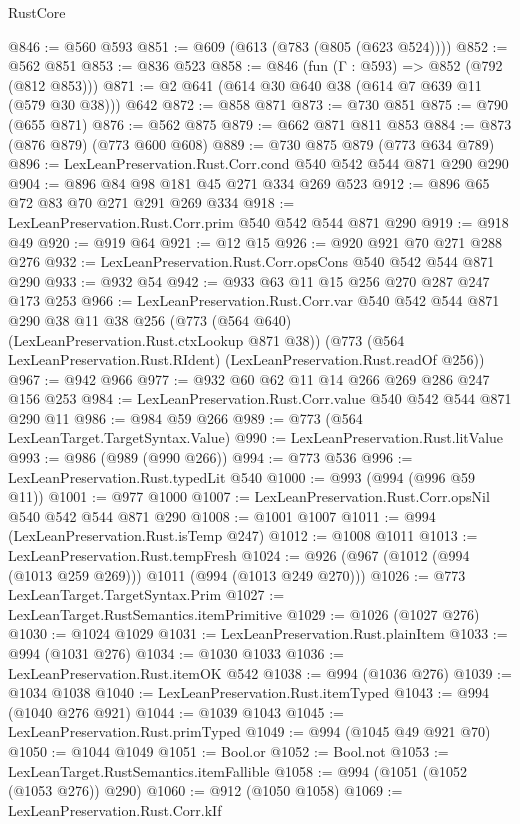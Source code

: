 \begin{lexlean}{RustCore}
\begin{coremodule}
@846 := @560 @593
@851 := @609 (@613 (@783 (@805 (@623 @524))))
@852 := @562 @851
@853 := @836 @523
@858 := @846 (fun (Γ : @593) => @852 (@792 (@812 @853)))
@871 := @2 @641 (@614 @30 @640 @38 (@614 @7 @639 @11 (@579 @30 @38))) @642
@872 := @858 @871
@873 := @730 @851
@875 := @790 (@655 @871)
@876 := @562 @875
@879 := @662 @871 @811 @853
@884 := @873 (@876 @879) (@773 @600 @608)
@889 := @730 @875 @879 (@773 @634 @789)
@896 := LexLeanPreservation.Rust.Corr.cond @540 @542 @544 @871 @290 @290
@904 := @896 @84 @98 @181 @45 @271 @334 @269 @523
@912 := @896 @65 @72 @83 @70 @271 @291 @269 @334
@918 := LexLeanPreservation.Rust.Corr.prim @540 @542 @544 @871 @290
@919 := @918 @49
@920 := @919 @64
@921 := @12 @15
@926 := @920 @921 @70 @271 @288 @276
@932 := LexLeanPreservation.Rust.Corr.opsCons @540 @542 @544 @871 @290
@933 := @932 @54
@942 := @933 @63 @11 @15 @256 @270 @287 @247 @173 @253
@966 := LexLeanPreservation.Rust.Corr.var
    @540
    @542
    @544
    @871
    @290
    @38
    @11
    @38
    @256
    (@773 (@564 @640) (LexLeanPreservation.Rust.ctxLookup @871 @38))
    (@773 (@564 LexLeanPreservation.Rust.RIdent) (LexLeanPreservation.Rust.readOf @256))
@967 := @942 @966
@977 := @932 @60 @62 @11 @14 @266 @269 @286 @247 @156 @253
@984 := LexLeanPreservation.Rust.Corr.value @540 @542 @544 @871 @290 @11
@986 := @984 @59 @266
@989 := @773 (@564 LexLeanTarget.TargetSyntax.Value)
@990 := LexLeanPreservation.Rust.litValue
@993 := @986 (@989 (@990 @266))
@994 := @773 @536
@996 := LexLeanPreservation.Rust.typedLit @540
@1000 := @993 (@994 (@996 @59 @11))
@1001 := @977 @1000
@1007 := LexLeanPreservation.Rust.Corr.opsNil @540 @542 @544 @871 @290
@1008 := @1001 @1007
@1011 := @994 (LexLeanPreservation.Rust.isTemp @247)
@1012 := @1008 @1011
@1013 := LexLeanPreservation.Rust.tempFresh
@1024 := @926 (@967 (@1012 (@994 (@1013 @259 @269))) @1011 (@994 (@1013 @249 @270)))
@1026 := @773 LexLeanTarget.TargetSyntax.Prim
@1027 := LexLeanTarget.RustSemantics.itemPrimitive
@1029 := @1026 (@1027 @276)
@1030 := @1024 @1029
@1031 := LexLeanPreservation.Rust.plainItem
@1033 := @994 (@1031 @276)
@1034 := @1030 @1033
@1036 := LexLeanPreservation.Rust.itemOK @542
@1038 := @994 (@1036 @276)
@1039 := @1034 @1038
@1040 := LexLeanPreservation.Rust.itemTyped
@1043 := @994 (@1040 @276 @921)
@1044 := @1039 @1043
@1045 := LexLeanPreservation.Rust.primTyped
@1049 := @994 (@1045 @49 @921 @70)
@1050 := @1044 @1049
@1051 := Bool.or
@1052 := Bool.not
@1053 := LexLeanTarget.RustSemantics.itemFallible
@1058 := @994 (@1051 (@1052 (@1053 @276)) @290)
@1060 := @912 (@1050 @1058)
@1069 := LexLeanPreservation.Rust.Corr.kIf

\end{coremodule}
\end{lexlean}
